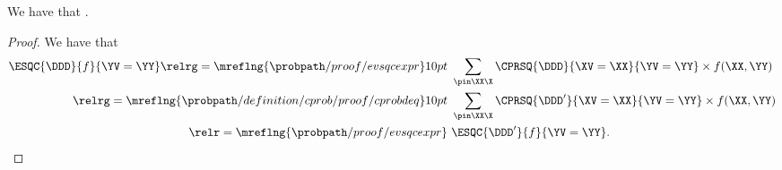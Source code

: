 \begin{proposition}
  We have that \evcdeqprop.%
\end{proposition}

\begin{proof}
  We have that
  \begin{align*}
  \ESQC{\DDD}{f}{\YV = \YY}
  \relrg = {\mreflng{\probpath/proof/evsqcexpr}} 10pt &\ 
  \sum_{\pin\XX\X}\CPRSQ{\DDD}{\XV = \XX}{\YV = \YY} \times f(\XX, \YY)\\
  \relrg = {\mreflng{\probpath/definition/cprob/proof/cprobdeq}} 10pt &\ 
  \sum_{\pin\XX\X}\CPRSQ{\DDD'}{\XV = \XX}{\YV = \YY} \times f(\XX, \YY)\\
  \relr = {\mreflng{\probpath/proof/evsqcexpr}} &\ 
  \ESQC{\DDD'}{f}{\YV = \YY}.
  \end{align*}
\end{proof}
